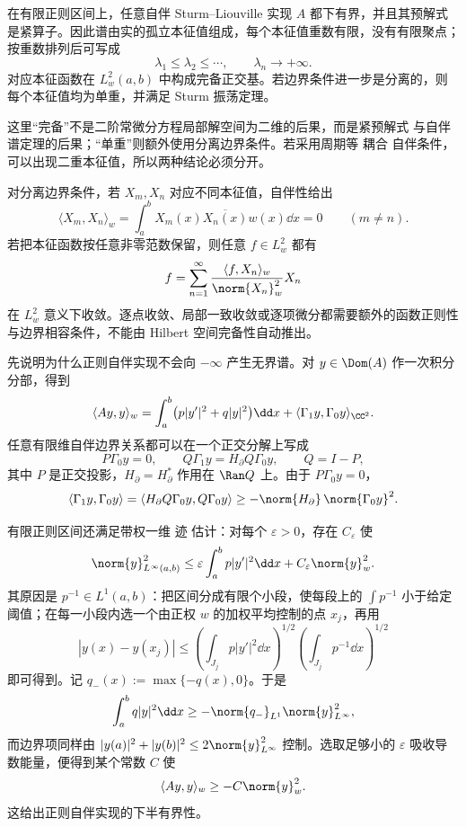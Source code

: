 \begin{theorem}\label{thm:math-sl-regular-spectrum}
在有限正则区间上，任意自伴 Sturm--Liouville 实现 $A$ 都下有界，并且其预解式是紧算子。因此谱由实的孤立本征值组成，每个本征值重数有限，没有有限聚点；按重数排列后可写成
\[
 \lambda_1\le\lambda_2\le\cdots,
 \qquad
 \lambda_n\longrightarrow+\infty.
\]
对应本征函数在 $L^2_w(a,b)$ 中构成完备正交基。若边界条件进一步是分离的，则每个本征值均为单重，并满足 Sturm 振荡定理。
\end{theorem}

这里“完备”不是二阶常微分方程局部解空间为二维的后果，而是紧预解式 与自伴谱定理的后果；“单重”则额外使用分离边界条件。若采用周期等 耦合 自伴条件，可以出现二重本征值，所以两种结论必须分开。

对分离边界条件，若 $X_m,X_n$ 对应不同本征值，自伴性给出
\begin{equation*}\langle X_m,X_n\rangle_w
 =\int_a^bX_m(x)\overline{X_n(x)}w(x)\dd x=0
 \qquad(m\neq n).
\end{equation*}
若把本征函数按任意非零范数保留，则任意 $f\in L^2_w$ 都有
\begin{equation*}f=\sum_{n=1}^\infty
 \frac{\langle f,X_n\rangle_w}{\norm{X_n}_w^2}X_n
\end{equation*}
在 $L^2_w$ 意义下收敛。逐点收敛、局部一致收敛或逐项微分都需要额外的函数正则性与边界相容条件，不能由 Hilbert 空间完备性自动推出。

先说明为什么正则自伴实现不会向 $-\infty$ 产生无界谱。对 $y\in\Dom(A)$ 作一次积分分部，得到
\[
 \langle Ay,y\rangle_w
 =\int_a^b\bigl(p|y'|^2+q|y|^2\bigr)\dd x
 +\langle\Gamma_1y,\Gamma_0y\rangle_{\CC^2}.
\]
任意有限维自伴边界关系都可以在一个正交分解上写成
\[
 P\Gamma_0y=0,
 \qquad
 Q\Gamma_1y=H_{\partial}Q\Gamma_0y,
 \qquad
 Q=I-P,
\]
其中 $P$ 是正交投影，$H_{\partial}=H_{\partial}^*$ 作用在 $\Ran Q$ 上。由于 $P\Gamma_0y=0$，
\[
 \langle\Gamma_1y,\Gamma_0y\rangle
 =\langle H_{\partial}Q\Gamma_0y,Q\Gamma_0y\rangle
 \ge-\norm{H_{\partial}}\,\norm{\Gamma_0y}^2.
\]

有限正则区间还满足带权一维 迹 估计：对每个 $\varepsilon>0$，存在 $C_\varepsilon$ 使
\begin{equation}\label{eq:math-sl-weighted-trace-estimate}
 \norm{y}_{L^\infty(a,b)}^2
 \le\varepsilon\int_a^bp|y'|^2\dd x
 +C_\varepsilon\norm{y}_w^2.
\end{equation}
其原因是 $p^{-1}\in L^1(a,b)$：把区间分成有限个小段，使每段上的 $\int p^{-1}$ 小于给定阈值；在每一小段内选一个由正权 $w$ 的加权平均控制的点 $x_j$，再用
\[
 |y(x)-y(x_j)|
 \le
 \left(\int_{J_j}p|y'|^2\dd x\right)^{1/2}
 \left(\int_{J_j}p^{-1}\dd x\right)^{1/2}
\]
即可得到。记 $q_-(x):=\max\{-q(x),0\}$。于是
\[
 \int_a^b q|y|^2\dd x
 \ge-\norm{q_-}_{L^1}\norm{y}_{L^\infty}^2,
\]
而边界项同样由 $|y(a)|^2+|y(b)|^2\le2\norm{y}_{L^\infty}^2$ 控制。选取足够小的 $\varepsilon$ 吸收导数能量，便得到某个常数 $C$ 使
\[
 \langle Ay,y\rangle_w\ge-C\norm{y}_w^2.
\]
这给出正则自伴实现的下半有界性。

